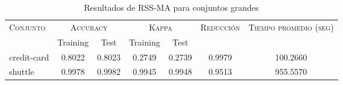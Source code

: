 \begin{table}[]
\centering
\begin{tabular}{l c c c c c c}
\hline
\multirow{2}{*}{\textsc{Conjunto}}
	& \multicolumn{2}{c}{\textsc{Accuracy}}
	& \multicolumn{2}{c}{\textsc{Kappa}}
	& \textsc{Reducción}
	& \textsc{Tiempo promedio (seg)} \\
	& Training & Test
	& Training & Test \\ 
\hline
\hline

credit-card & 0.8022 & 0.8023 & 0.2749 & 0.2739 & 0.9979 & 100.2660 \\
shuttle & 0.9978 & 0.9982 & 0.9945 & 0.9948 & 0.9513 & 955.5570 \\

\hline
\end{tabular}
\caption{Resultados de RSS-MA para conjuntos grandes }
\label{res-grande-RSS-MA}
\end{table}

